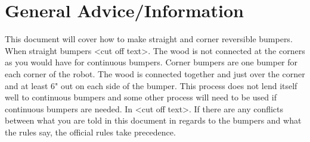 \documentclass[
10pt, %
a4paper, %
oneside, %
headinclude,footinclude, %
BCOR5mm, %
]{scrartcl}
\begin{document}

\newpage %

\section{General Advice/Information}

This document will cover how to make straight and corner reversible bumpers. When straight bumpers <cut off text>. The wood is not connected at the corners as you would have for continuous bumpers. Corner bumpers are one bumper for each corner of the robot. The wood is connected together and just over the corner and at least 6" out on each side of the bumper. This process does not lend itself well to continuous bumpers and some other process will need to be used if continuous bumpers are needed. In <cut off text>. If there are any conflicts between what you are told in this document in regards to the bumpers and what the rules say, the official rules take precedence.\\
\end{document}
